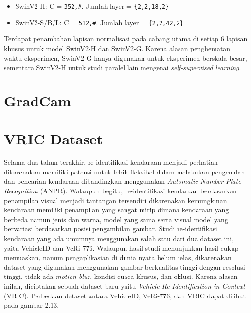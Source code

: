 \begin{itemize}[nolistsep]

  \item SwinV2-H: C = \verb|352,#|. Jumlah layer = \verb|{2,2,18,2}|

  \item SwinV2-S/B/L: C = \verb|512,#|. Jumlah layer = \verb|{2,2,42,2}|

\end{itemize}

Terdapat penambahan lapisan normalisasi pada cabang utama di setiap 6 lapisan khusus untuk model SwinV2-H dan SwinV2-G. Karena alasan penghematan waktu eksperimen, \linebreak SwinV2-G hanya digunakan untuk eksperimen 
berskala besar, sementara SwinV2-H untuk studi paralel lain mengenai \emph{self-supervised learning}.\parencite{Liuv22021}


\section{GradCam}
\label{sec:gradcam}



\section{VRIC Dataset}
\label{sec:vricdataset}

Selama dua tahun terakhir, re-identifikasi kendaraan menjadi perhatian dikarenakan \linebreak memiliki potensi untuk lebih fleksibel dalam melakukan pengenalan dan pencarian kendaraan dibandingkan 
menggunakan \emph{Automatic Number Plate Recognition} (ANPR). Walaupun begitu, re-identifikasi kendaraan berdasarkan penampilan visual menjadi tantangan tersendiri dikarenakan kemungkinan 
kendaraan memiliki penampilan yang sangat mirip dimana kendaraan yang berbeda namun jenis dan warna, model yang sama serta visual model yang bervariasi \linebreak berdasarkan posisi pengambilan 
gambar. Studi re-identifikasi kendaraan yang ada umumnya menggunakan salah satu dari dua dataset ini, yaitu VehicleID dan VeRi-776. Walaupun hasil studi menunjukkan hasil cukup memuaskan, 
namun pengaplikasian di dunia nyata belum jelas, dikarenakan dataset yang digunakan menggunakan gambar berkualitas tinggi dengan resolusi tinggi, tidak ada \emph{motion blur}, kondisi cuaca 
khusus, dan oklusi. Karena alasan inilah, diciptakan sebuah dataset baru yaitu \emph{Vehicle Re-Identification in Context} (VRIC). Perbedaan dataset antara VehicleID, VeRi-776, dan VRIC 
dapat dilihat pada gambar 2.13.\parencite{Kanaci2018}

